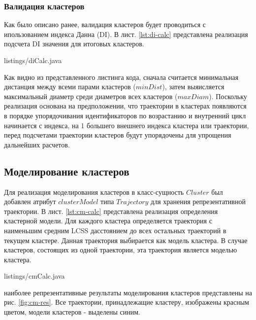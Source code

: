 \subsubsection{Валидация кластеров}

Как было описано ранее, валидация кластеров будет проводиться с ипользованием индекса Данна (DI). В лист. \ref{lst:di-calc} представлена реализация подсчета DI значения для итоговых кластеров.

 {listings/diCalc.java}

Как видно из представленного листинга кода, сначала считается минимальная дистанция между всеми парами кластеров ($minDist$), затем выяисляется максимальный диаметр среди диаметров всех кластеров ($maxDiam$). Поскольку реализация основана на предположении, что траектории в кластерах появляются в порядке упорядочивания идентификаторов по возрастанию и внутренний цикл начинается с индекса, на 1 большего внешнего индекса кластера или траектории, перед подсчетами траектории кластеров будут упорядочены для упрощения дальнейших расчетов.

\subsection{Моделирование кластеров}

Для реализация моделирования кластеров в класс-сущность $Cluster$ был добавлен атрибут $clusterModel$ типа $Trajectory$ для хранения репрезентативной траектории. В лист. \ref{lst:cm-calc} представлена реализация определения кластерной модели. Для каждого кластера определяется траектория с наименьшим средним LCSS дасстоянием до всех остальных траекторий в текущем кластере. Данная траектория выбирается как модель кластера. В случае кластеров, состоящих из одной траектории, эта траектория является моделью кластера.

 {listings/cmCalc.java}

наиболее репрезентативные результаты моделирования кластеров представлены на рис. \ref{fig:cm-res}. Все траектории, принадлежащие кластеру, изображены красным цветом, модели кластеров - выделены синим.


